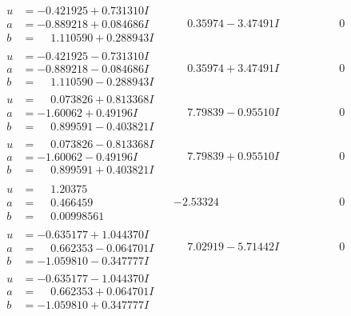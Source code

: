 \documentclass[1p]{elsarticle_modified}
\theoremstyle{definition}
\begin{document}
$$\begin{array}{c|c|c}
\begin{aligned}
u &= -0.421925 + 0.731310 I \\
a &= -0.889218 + 0.084686 I \\
b &= \phantom{-}1.110590 + 0.288943 I\end{aligned}
 & \phantom{-}0.35974 - 3.47491 I & \phantom{-0.000000 } 0 \\ \hline\begin{aligned}
u &= -0.421925 - 0.731310 I \\
a &= -0.889218 - 0.084686 I \\
b &= \phantom{-}1.110590 - 0.288943 I\end{aligned}
 & \phantom{-}0.35974 + 3.47491 I & \phantom{-0.000000 } 0 \\ \hline\begin{aligned}
u &= \phantom{-}0.073826 + 0.813368 I \\
a &= -1.60062 + 0.49196 I \\
b &= \phantom{-}0.899591 - 0.403821 I\end{aligned}
 & \phantom{-}7.79839 - 0.95510 I & \phantom{-0.000000 } 0 \\ \hline\begin{aligned}
u &= \phantom{-}0.073826 - 0.813368 I \\
a &= -1.60062 - 0.49196 I \\
b &= \phantom{-}0.899591 + 0.403821 I\end{aligned}
 & \phantom{-}7.79839 + 0.95510 I & \phantom{-0.000000 } 0 \\ \hline\begin{aligned}
u &= \phantom{-}1.20375\phantom{ +0.000000I} \\
a &= \phantom{-}0.466459\phantom{ +0.000000I} \\
b &= \phantom{-}0.00998561\phantom{ +0.000000I}\end{aligned}
 & -2.53324\phantom{ +0.000000I} & \phantom{-0.000000 } 0 \\ \hline\begin{aligned}
u &= -0.635177 + 1.044370 I \\
a &= \phantom{-}0.662353 - 0.064701 I \\
b &= -1.059810 - 0.347777 I\end{aligned}
 & \phantom{-}7.02919 - 5.71442 I & \phantom{-0.000000 } 0 \\ \hline\begin{aligned}
u &= -0.635177 - 1.044370 I \\
a &= \phantom{-}0.662353 + 0.064701 I \\
b &= -1.059810 + 0.347777 I\end{aligned}

\end{array}$$
\end{document}
